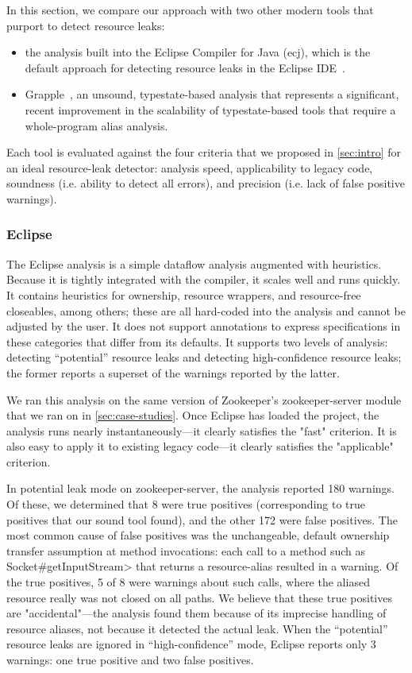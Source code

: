 In this section, we compare our approach with two other modern tools that purport to detect resource leaks:
\begin{itemize}
\item the analysis built into the Eclipse Compiler for Java (ecj), which is the default approach
  for detecting resource leaks in the Eclipse IDE~\cite{ecj-resource-leak}.
\item Grapple~\cite{zuo2019grapple}, an unsound, typestate-based analysis that represents a significant, recent
  improvement in the scalability of typestate-based tools that require a whole-program alias analysis.
\end{itemize}
Each tool is evaluated against the four criteria that we proposed in \cref{sec:intro}
for an ideal resource-leak detector: analysis speed, applicability to legacy code, soundness (i.e. ability
to detect all errors), and precision (i.e. lack of false positive warnings).

\subsubsection{Eclipse}
\label{sec:eclipse}

The Eclipse analysis is a simple dataflow analysis
augmented with heuristics. Because it is tightly integrated with
the compiler, it scales well and runs quickly. It contains
heuristics for ownership, resource wrappers, and resource-free
closeables, among others; these are all hard-coded into the analysis and cannot
be adjusted by the user. It does not support annotations to express
specifications in these categories that differ from its defaults.
It supports two levels of analysis: detecting ``potential'' resource
leaks and detecting high-confidence resource leaks; the former reports a superset
of the warnings reported by the latter.

We ran this analysis on the same version of Zookeeper's zookeeper-server
module that we ran \tool on in \cref{sec:case-studies}. Once Eclipse
has loaded the project, the analysis runs nearly instantaneously---it
clearly satisfies the "fast" criterion. It is also easy to apply it to
existing legacy code---it clearly satisfies the "applicable" criterion.

In potential leak mode on zookeeper-server, the analysis reported 180
warnings.  Of these, we determined that 8 were true positives
(corresponding to true positives that our sound tool found), and the
other 172 were false positives.  The most common cause of false
positives was the unchangeable, default ownership transfer assumption
at method invocations: each call to a method such as
\<Socket\#getInputStream> that returns a resource-alias resulted in a
warning.  Of the true positives, 5 of 8 were warnings about such
calls, where the aliased resource really was not closed on all
paths. We believe that these true positives are "accidental"---the
analysis found them because of its imprecise handling of resource
aliases, not because it detected the actual leak. When the
``potential'' resource leaks are ignored in ``high-confidence'' mode,
Eclipse reports only 3 warnings: one true positive and two false
positives.

